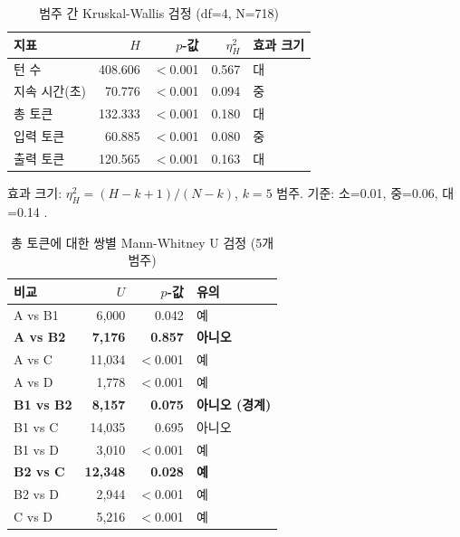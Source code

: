 \documentclass[a4paper,11pt]{article}
\begin{document}
\begin{table}[H]
\centering
\caption{범주 간 Kruskal-Wallis 검정 (df=4, N=718)}
\label{tab:kw-cross-cat}
{\small
\begin{tabular}{lrrrl}
\toprule
지표 & $H$ & $p$-값 & $\eta^{2}_{H}$ & 효과 크기 \\
\midrule
턴 수        & 408.606 & $<$0.001 & 0.567 & 대 \\
지속 시간(초) & 70.776  & $<$0.001 & 0.094 & 중 \\
총 토큰      & 132.333 & $<$0.001 & 0.180 & 대 \\
입력 토큰    & 60.885  & $<$0.001 & 0.080 & 중 \\
출력 토큰    & 120.565 & $<$0.001 & 0.163 & 대 \\
\bottomrule
\end{tabular}
}

\smallskip
{\footnotesize 효과 크기: $\eta^{2}_{H} = (H - k + 1) / (N - k)$, $k=5$ 범주. 기준: 소=0.01, 중=0.06, 대=0.14 \citep{cohen1988}.}
\end{table}

\begin{table}[H]
\centering
\caption{총 토큰에 대한 쌍별 Mann-Whitney U 검정 (5개 범주)}
\label{tab:pairwise-mwu}
{\small
\begin{tabular}{lrrl}
\toprule
비교 & $U$ & $p$-값 & 유의 \\
\midrule
A vs B1           & 6,000  & 0.042   & 예 \\
\textbf{A vs B2}  & \textbf{7,176}  & \textbf{0.857} & \textbf{아니오} \\
A vs C            & 11,034 & $<$0.001 & 예 \\
A vs D            & 1,778  & $<$0.001 & 예 \\
\textbf{B1 vs B2} & \textbf{8,157}  & \textbf{0.075} & \textbf{아니오 (경계)} \\
B1 vs C           & 14,035 & 0.695   & 아니오 \\
B1 vs D           & 3,010  & $<$0.001 & 예 \\
\textbf{B2 vs C}  & \textbf{12,348} & \textbf{0.028} & \textbf{예} \\
B2 vs D           & 2,944  & $<$0.001 & 예 \\
C vs D            & 5,216  & $<$0.001 & 예 \\
\bottomrule
\end{tabular}
}
\end{table}
\end{document}
